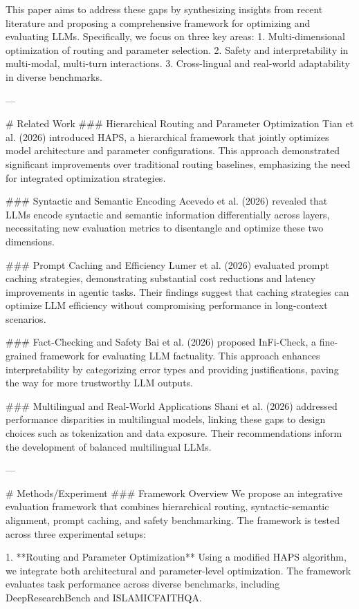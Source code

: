 This paper aims to address these gaps by synthesizing insights from recent literature and proposing a comprehensive framework for optimizing and evaluating LLMs. Specifically, we focus on three key areas:  
1. Multi-dimensional optimization of routing and parameter selection.  
2. Safety and interpretability in multi-modal, multi-turn interactions.  
3. Cross-lingual and real-world adaptability in diverse benchmarks.

---

# Related Work  
### Hierarchical Routing and Parameter Optimization  
Tian et al. (2026) introduced HAPS, a hierarchical framework that jointly optimizes model architecture and parameter configurations. This approach demonstrated significant improvements over traditional routing baselines, emphasizing the need for integrated optimization strategies.

### Syntactic and Semantic Encoding  
Acevedo et al. (2026) revealed that LLMs encode syntactic and semantic information differentially across layers, necessitating new evaluation metrics to disentangle and optimize these two dimensions.

### Prompt Caching and Efficiency  
Lumer et al. (2026) evaluated prompt caching strategies, demonstrating substantial cost reductions and latency improvements in agentic tasks. Their findings suggest that caching strategies can optimize LLM efficiency without compromising performance in long-context scenarios.

### Fact-Checking and Safety  
Bai et al. (2026) proposed InFi-Check, a fine-grained framework for evaluating LLM factuality. This approach enhances interpretability by categorizing error types and providing justifications, paving the way for more trustworthy LLM outputs.

### Multilingual and Real-World Applications  
Shani et al. (2026) addressed performance disparities in multilingual models, linking these gaps to design choices such as tokenization and data exposure. Their recommendations inform the development of balanced multilingual LLMs.

---

# Methods/Experiment  
### Framework Overview  
We propose an integrative evaluation framework that combines hierarchical routing, syntactic-semantic alignment, prompt caching, and safety benchmarking. The framework is tested across three experimental setups:  

1. **Routing and Parameter Optimization**  
   Using a modified HAPS algorithm, we integrate both architectural and parameter-level optimization. The framework evaluates task performance across diverse benchmarks, including DeepResearchBench and ISLAMICFAITHQA.  

